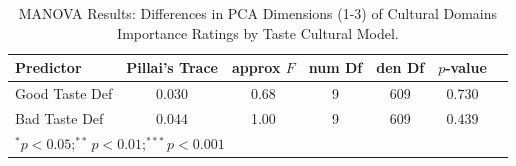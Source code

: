 \begin{table}[htpb]
\centering
\begin{tabular}{lcccccc}
\toprule
Predictor & Pillai's Trace & approx $F$ & num Df & den Df & $p$-value \\
\midrule
Good Taste Def & 0.030 & 0.68 & 9 & 609 & 0.730 \\
Bad Taste Def & 0.044 & 1.00 & 9 & 609 & 0.439 \\
\bottomrule
\multicolumn{6}{l}{\footnotesize $^{*}p<0.05; ^{**}p<0.01; ^{***}p<0.001$} \\
\end{tabular}
\caption{MANOVA Results: Differences in PCA Dimensions (1-3) of Cultural Domains Importance Ratings by Taste Cultural Model.}
\label{tab:anova_pca_importance}
\end{table}

